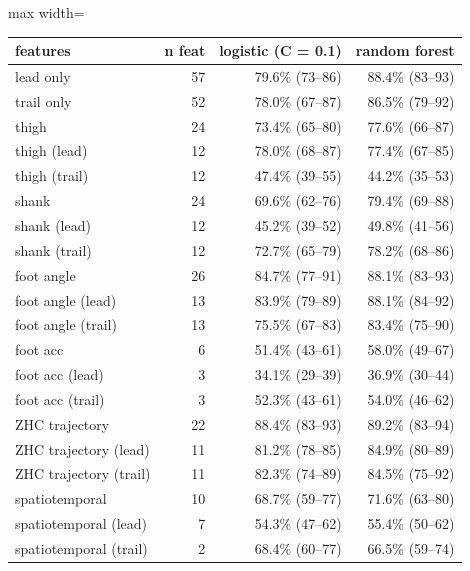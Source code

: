 \begin{adjustbox}{max width=\textwidth}
{\footnotesize
\begin{tabular}{lrrr}
\toprule
\textbf{features} & \textbf{n feat} & \textbf{logistic (C = 0.1)} & \textbf{random forest} \\
\midrule
lead only & 57 & 79.6\% (73--86) & 88.4\% (83--93) \\
trail only & 52 & 78.0\% (67--87) & 86.5\% (79--92) \\
thigh & 24 & 73.4\% (65--80) & 77.6\% (66--87) \\
thigh (lead) & 12 & 78.0\% (68--87) & 77.4\% (67--85) \\
thigh (trail) & 12 & 47.4\% (39--55) & 44.2\% (35--53) \\
shank & 24 & 69.6\% (62--76) & 79.4\% (69--88) \\
shank (lead) & 12 & 45.2\% (39--52) & 49.8\% (41--56) \\
shank (trail) & 12 & 72.7\% (65--79) & 78.2\% (68--86) \\
foot angle & 26 & 84.7\% (77--91) & 88.1\% (83--93) \\
foot angle (lead) & 13 & 83.9\% (79--89) & 88.1\% (84--92) \\
foot angle (trail) & 13 & 75.5\% (67--83) & 83.4\% (75--90) \\
foot acc & 6 & 51.4\% (43--61) & 58.0\% (49--67) \\
foot acc (lead) & 3 & 34.1\% (29--39) & 36.9\% (30--44) \\
foot acc (trail) & 3 & 52.3\% (43--61) & 54.0\% (46--62) \\
ZHC trajectory & 22 & 88.4\% (83--93) & 89.2\% (83--94) \\
ZHC trajectory (lead) & 11 & 81.2\% (78--85) & 84.9\% (80--89) \\
ZHC trajectory (trail) & 11 & 82.3\% (74--89) & 84.5\% (75--92) \\
spatiotemporal & 10 & 68.7\% (59--77) & 71.6\% (63--80) \\
spatiotemporal (lead) & 7 & 54.3\% (47--62) & 55.4\% (50--62) \\
spatiotemporal (trail) & 2 & 68.4\% (60--77) & 66.5\% (59--74) \\
\bottomrule
\end{tabular}
}
\end{adjustbox}
